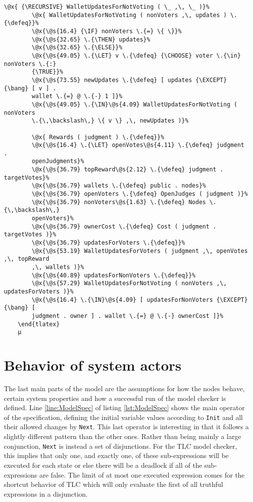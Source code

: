 \begin{lstlisting}[caption=Operator updating wallets for judgment, label=lst:ModelRewardChaincode]
        \@x{ {\RECURSIVE} WalletUpdatesForNotVoting ( \_ ,\, \_ )}%
        \@x{ WalletUpdatesForNotVoting ( nonVoters ,\, updates ) \.{\defeq}}%
        \@x{\@s{16.4} {\IF} nonVoters \.{=} \{ \}}%
        \@x{\@s{32.65} \.{\THEN} updates}%
        \@x{\@s{32.65} \.{\ELSE}}%
        \@x{\@s{49.05} \.{\LET} v \.{\defeq} {\CHOOSE} voter \.{\in} nonVoters \.{:}
        {\TRUE}}%
        \@x{\@s{73.55} newUpdates \.{\defeq} [ updates {\EXCEPT} {\bang} [ v ] .
        wallet \.{=} @ \.{-} 1 ]}%
        \@x{\@s{49.05} \.{\IN}\@s{4.09} WalletUpdatesForNotVoting ( nonVoters
        \.{\,\backslash\,} \{ v \} ,\, newUpdates )}%

        \@x{ Rewards ( judgment ) \.{\defeq}}%
        \@x{\@s{16.4} \.{\LET} openVotes\@s{4.11} \.{\defeq} judgment .
        openJudgments}%
        \@x{\@s{36.79} topReward\@s{2.12} \.{\defeq} judgment . targetVotes}%
        \@x{\@s{36.79} wallets \.{\defeq} public . nodes}%
        \@x{\@s{36.79} openVoters \.{\defeq} OpenJudges ( judgment )}%
        \@x{\@s{36.79} nonVoters\@s{1.63} \.{\defeq} Nodes \.{\,\backslash\,}
        openVoters}%
        \@x{\@s{36.79} ownerCost \.{\defeq} Cost ( judgment . targetVotes )}%
        \@x{\@s{36.79} updatesForVoters \.{\defeq}}%
        \@x{\@s{53.19} WalletUpdatesForVoters ( judgment ,\, openVotes ,\, topReward
        ,\, wallets )}%
        \@x{\@s{40.89} updatesForNonVoters \.{\defeq}}%
        \@x{\@s{57.29} WalletUpdatesForNotVoting ( nonVoters ,\, updatesForVoters )}%
        \@x{\@s{16.4} \.{\IN}\@s{4.09} [ updatesForNonVoters {\EXCEPT} {\bang} [
        judgment . owner ] . wallet \.{=} @ \.{-} ownerCost ]}%
    \end{tlatex}
    µ
\end{lstlisting}

\section{Behavior of system actors}
\label{subsec:ModelSpec}

The last main parts of the model are the assumptions for how the nodes behave, certain system properties and how a successful run of the model checker is defined. Line \ref{line:ModelSpec} of listing \ref{lst:ModelSpec} shows the main operator of the specification, defining the initial variable values according to \texttt{Init} and all their allowed changes by \texttt{Next}. This last operator is interesting in that it follows a slightly different pattern than the other ones. Rather than being mainly a large conjunction, \texttt{Next} is instead a set of disjunctions. For the TLC model checker, this implies that only one, and exactly one, of these sub-expressions will be executed for each state or else there will be a deadlock if all of the sub-expressions are false. The limit of at most one executed expression comes for the shortcut behavior of TLC which will only evaluate the first of all truthful expressions in a disjunction.

